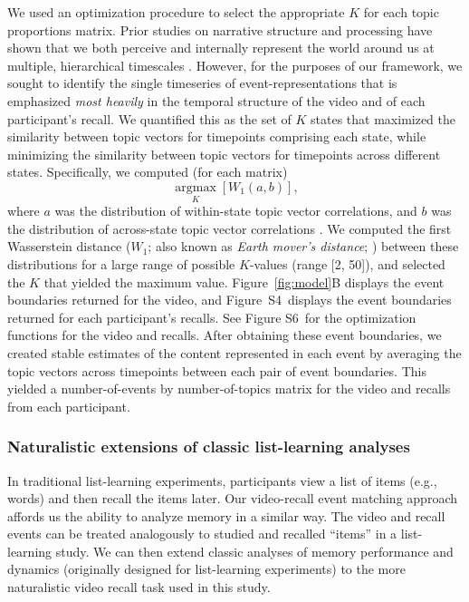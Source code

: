 \documentclass{article}
\newcommand{\argmax}{\mathop{\mathrm{argmax}}\limits}
\newcommand{\corrmats}{S4}
\newcommand{\kopt}{S6}
\begin{document}
We used an optimization procedure to select the appropriate $K$ for each topic proportions matrix.  Prior studies on narrative structure and processing have shown that we both perceive and internally represent the world around us at multiple, hierarchical timescales \citep[e.g.,][]{HassEtal08, LernEtal11, HassEtal15, ChenEtal17, BaldEtal17, BaldEtal18}.  However, for the purposes of our framework, we sought to identify the single timeseries of event-representations that is emphasized \textit{most heavily} in the temporal structure of the video and of each participant's recall.  We quantified this as the set of $K$ states that maximized the similarity between topic vectors for timepoints comprising each state, while minimizing the similarity between topic vectors for timepoints across different states.  Specifically, we computed (for each matrix)
\[
  \argmax_K \left[W_{1}(a, b)\right],
\]
where $a$ was the distribution of within-state topic vector correlations, and $b$ was the distribution of across-state topic vector correlations .  We computed the first Wasserstein distance ($W_{1}$; also known as \textit{Earth mover's distance}; \citealp{Dobr70, RamdEtal17}) between these distributions for a large range of possible $K$-values (range [2, 50]), and selected the $K$ that yielded the maximum value.  Figure~\ref{fig:model}B displays the event boundaries returned for the video, and Figure~\corrmats~displays the event boundaries returned for each participant's recalls.  See Figure \kopt~for the optimization functions for the video and recalls.  After obtaining these event boundaries, we created stable estimates of the content represented in each event by averaging the topic vectors across timepoints between each pair of event boundaries.  This yielded a number-of-events by number-of-topics matrix for the video and recalls from each participant.

\subsubsection*{Naturalistic extensions of classic list-learning analyses}
In traditional list-learning experiments, participants view a list of items (e.g., words) and then recall the items later.  Our video-recall event matching approach affords us the ability to analyze memory in a similar way. The video and recall events can be treated analogously to studied and recalled ``items'' in a list-learning study.  We can then extend classic analyses of memory performance and dynamics (originally designed for list-learning experiments) to the more naturalistic video recall task used in this study.
\end{document}
